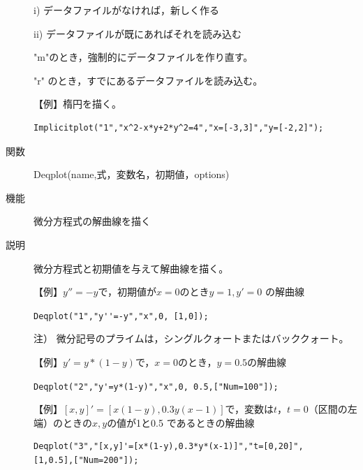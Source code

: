 \documentclass[papersize,a4paper,10pt,uplatex]{jsarticle}
\begin{document}
\begin{description}
i) データファイルがなければ，新しく作る

ii) データファイルが既にあればそれを読み込む

"m"のとき，強制的にデータファイルを作り直す。

"r" のとき，すでにあるデータファイルを読み込む。

\vspace{\baselineskip}
【例】楕円を描く。
\begin{verbatim}
Implicitplot("1","x^2-x*y+2*y^2=4","x=[-3,3]","y=[-2,2]");
\end{verbatim}

\vspace{\baselineskip}
\hspace{20mm}\scalebox{0.9}{}

\vspace{\baselineskip}
\hypertarget{deqplot}{}
\item[関数]Deqplot(name,式，変数名，初期値，options)
\item[機能]微分方程式の解曲線を描く
\item[説明]微分方程式と初期値を与えて解曲線を描く。

\vspace{\baselineskip}
【例】$y''=-y$で，初期値が$x=0$のとき$y=1,y'=0$ の解曲線

\verb|Deqplot("1","y''=-y","x",0, [1,0]); | 
 
注） 微分記号のプライムは，シングルクォートまたはバッククォート。

\vspace{\baselineskip}
\hspace{20mm}

\vspace{\baselineskip}
【例】$y'=y*(1-y)$で，$x=0$のとき，$y=0.5$の解曲線

 \verb|Deqplot("2","y'=y*(1-y)","x",0, 0.5,["Num=100"]);| 
 
\vspace{\baselineskip}
\hspace{20mm}

\vspace{\baselineskip}

【例】$[x,y]'=[x(1-y),0.3y(x-1)]$で，変数は$t$，$t=0$（区間の左端）のときの$x, y$の値が1と0.5 であるときの解曲線
\begin{verbatim}
Deqplot("3","[x,y]'=[x*(1-y),0.3*y*(x-1)]","t=[0,20]",
[1,0.5],["Num=200"]);
\end{verbatim} 


\end{description}
\end{document}
